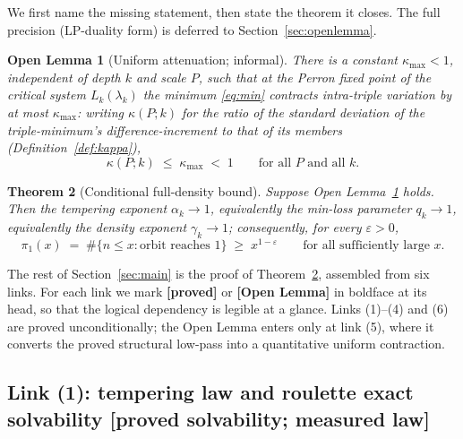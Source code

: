 \documentclass[11pt]{article}
\newtheorem{theorem}{Theorem}
\newtheorem{openlemma}[theorem]{Open Lemma}
\theoremstyle{definition}
\theoremstyle{remark}
\newcommand{\lam}{\lambda}
\newcommand{\gam}{\gamma}
\newcommand{\kap}{\kappa}
\begin{document}
We first name the missing statement, then state the theorem it closes. The
full precision (LP-duality form) is deferred to Section~\ref{sec:openlemma}.

\begin{openlemma}[Uniform attenuation; informal]\label{open:informal}
There is a constant $\kap_{\max} < 1$, independent of depth $k$ and scale $P$,
such that at the Perron fixed point of the critical system $L_k(\lam_k)$ the
minimum \eqref{eq:min} contracts intra-triple variation by at most
$\kap_{\max}$: writing $\kap(P; k)$ for the ratio of the standard deviation of
the triple-minimum's difference-increment to that of its members
(Definition~\ref{def:kappa}),
\[
\kap(P; k) \;\leq\; \kap_{\max} \;<\; 1
\qquad \text{for all } P \text{ and all } k .
\]
\end{openlemma}

\begin{theorem}[Conditional full-density bound]\label{thm:main}
Suppose Open Lemma~\ref{open:informal} holds. Then the tempering exponent
$\alpha_k \to 1$, equivalently the min-loss parameter $q_k \to 1$, equivalently
the density exponent $\gam_k \to 1$; consequently, for every $\varepsilon > 0$,
\[
\pi_1(x) \;=\; \#\{ n \leq x : \text{orbit reaches } 1 \}
\;\geq\; x^{1 - \varepsilon}
\qquad \text{for all sufficiently large } x .
\]
\end{theorem}

The rest of Section~\ref{sec:main} is the proof of Theorem~\ref{thm:main},
assembled from six links. For each link we mark \textbf{[proved]} or
\textbf{[Open Lemma]} in boldface at its head, so that the logical dependency
is legible at a glance. Links (1)--(4) and (6) are proved unconditionally; the
Open Lemma enters only at link (5), where it converts the proved structural
low-pass into a quantitative uniform contraction.

\subsection{Link (1): tempering law and roulette exact solvability
\textnormal{[proved solvability; measured law]}}
\label{sec:link1}
\end{document}
